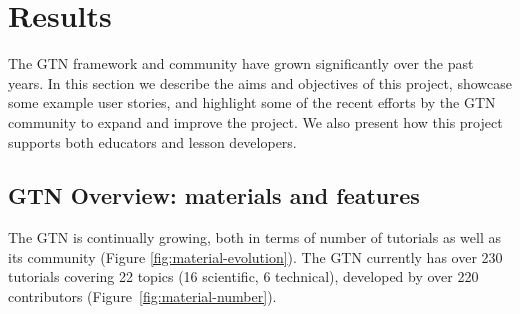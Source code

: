 \documentclass[10pt,letterpaper]{article}
\begin{document}
\section*{Results}

The GTN framework and community have grown significantly over the past years. In this section we describe the aims and objectives of this project, showcase some example user stories, and highlight some of the recent efforts by the GTN community to expand and improve the project. We also present how this project supports both educators and lesson developers.

\subsection*{GTN Overview: materials and features}
The GTN is continually growing, both in terms of number of tutorials as well as its community (Figure \ref{fig:material-evolution}). The GTN currently has over 230 tutorials covering 22 topics (16 scientific, 6 technical), developed by over 220 contributors (Figure~\ref{fig:material-number}).
\end{document}
